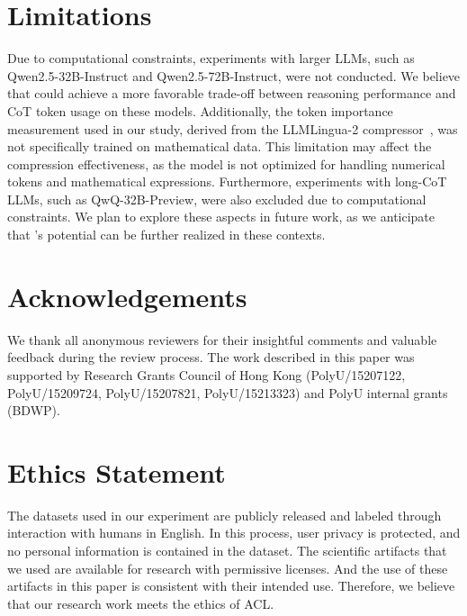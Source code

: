 \section*{Limitations}
\label{subsec:limitation} 

Due to computational constraints, experiments with larger LLMs, such as Qwen2.5-32B-Instruct and Qwen2.5-72B-Instruct, were not conducted. We believe that \method could achieve a more favorable trade-off between reasoning performance and CoT token usage on these models. Additionally, the token importance measurement used in our study, derived from the LLMLingua-2 compressor~\cite{pan:2024llmlingua2}, was not specifically trained on mathematical data. This limitation may affect the compression effectiveness, as the model is not optimized for handling numerical tokens and mathematical expressions. Furthermore, experiments with long-CoT LLMs, such as QwQ-32B-Preview, were also excluded due to computational constraints. We plan to explore these aspects in future work, as we anticipate that \method’s potential can be further realized in these contexts.

\section*{Acknowledgements}
We thank all anonymous reviewers for their insightful comments and valuable feedback during the review process. The work described in this paper was supported by Research Grants Council of Hong Kong (PolyU/15207122, PolyU/15209724, PolyU/15207821, PolyU/15213323) and PolyU internal grants (BDWP). 

\section*{Ethics Statement}
\label{subsec:ethics} 
The datasets used in our experiment are publicly released and labeled through interaction with humans in English. In this process, user privacy is protected, and no personal information is contained in the dataset. The scientific artifacts that we used are available for research with permissive licenses. And the use of these artifacts in this paper is consistent with their intended use. Therefore, we believe that our research work meets the ethics of ACL. 
